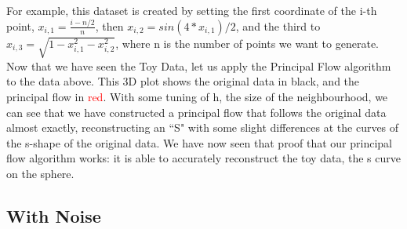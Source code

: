 \documentclass[12pt]{report}
\begin{document}
\newpage

For example, this dataset is created by setting the first coordinate of the 
i-th point, $x_{i, 1} = \frac{i-n/2}{n}$, then $x_{i, 2} = sin(4*x_{i, 1})/2$, 
and the third to $x_{i, 3} = \sqrt{1-x_{i, 1}^2 - x_{i, 2}^2}$, 
where n is the number of points we want to generate.\\
Now that we have seen the Toy Data, let us apply the Principal Flow 
algorithm to the data above.
This 3D plot shows the original data in black, and the principal flow in 
\textcolor{red}{red}.
With some tuning of h, the size of the neighbourhood, we can see that we have constructed
a principal flow that follows the original data almost
exactly, reconstructing an ``S" with some slight differences at the curves of the s-shape of
the original data.
We have now seen that proof that our principal flow algorithm works:
it is able to accurately reconstruct the toy data, 
the s curve on the sphere.

\subsection{With Noise}
\end{document}

